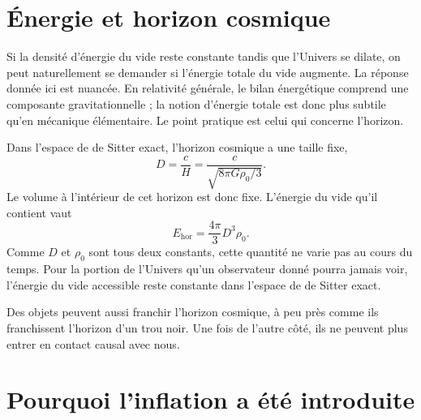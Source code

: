 \section{Énergie et horizon cosmique}

Si la densité d’énergie du vide reste constante tandis que l’Univers se dilate, on peut naturellement se demander si l’énergie totale du vide augmente. La réponse donnée ici est nuancée. En relativité générale, le bilan énergétique comprend une composante gravitationnelle ; la notion d’énergie totale est donc plus subtile qu’en mécanique élémentaire. Le point pratique est celui qui concerne l’horizon.

Dans l’espace de de Sitter exact, l’horizon cosmique a une taille fixe,
\begin{equation}
D=\frac{c}{H}
=\frac{c}{\sqrt{8\pi G\rho_0/3}}.
\end{equation}
Le volume à l’intérieur de cet horizon est donc fixe. L’énergie du vide qu’il contient vaut
\begin{equation}
E_{\mathrm{hor}}=\frac{4\pi}{3}D^3\rho_0.
\end{equation}
Comme \(D\) et \(\rho_0\) sont tous deux constants, cette quantité ne varie pas au cours du temps. Pour la portion de l’Univers qu’un observateur donné pourra jamais voir, l’énergie du vide accessible reste constante dans l’espace de de Sitter exact.

Des objets peuvent aussi franchir l’horizon cosmique, à peu près comme ils franchissent l’horizon d’un trou noir. Une fois de l’autre côté, ils ne peuvent plus entrer en contact causal avec nous.

\begin{classroomqa}
\end{classroomqa}

\section{Pourquoi l’inflation a été introduite}

